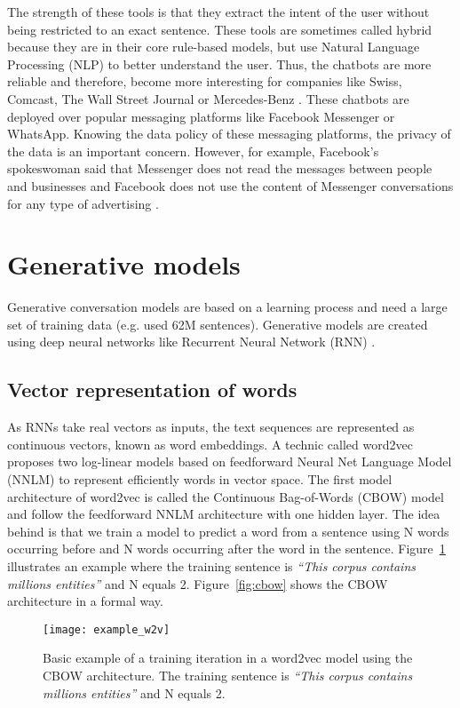 The strength of these tools is that they extract the intent of the user without being restricted to an exact sentence. These tools are sometimes called hybrid because they are in their core rule-based models, but use Natural Language Processing (NLP) to better understand the user. Thus, the chatbots are more reliable and therefore, become more interesting for companies like Swiss, Comcast, The Wall Street Journal or Mercedes-Benz \citep{dialogflow}. These chatbots are deployed over popular messaging platforms like Facebook Messenger or WhatsApp. Knowing the data policy of these messaging platforms, the privacy of the data is an important concern. However, for example, Facebook's spokeswoman said that Messenger does not read the messages between people and businesses and Facebook does not use the content of Messenger conversations for any type of advertising \citep{facebook-policy}.

\section{Generative models}
Generative conversation models are based on a learning process and need a large set of training data (e.g. \citet{1506.05869} used 62M sentences). Generative models are created using deep neural networks like Recurrent Neural Network (RNN) \citep{1503.02364,1506.05869}.

\subsection{Vector representation of words}

As RNNs take real vectors as inputs, the text sequences are represented as continuous vectors, known as word embeddings. A technic called word2vec \citep{1301.3781} proposes two log-linear models based on feedforward Neural Net Language Model (NNLM) to represent efficiently words in vector space. The first model architecture of word2vec is called the Continuous Bag-of-Words (CBOW) model and follow the feedforward NNLM architecture with one hidden layer.
The idea behind is that we train a model to predict a word from a sentence using N words occurring before and N words occurring after the word in the sentence. Figure~\ref{fig:example_w2v} illustrates an example where the training sentence is \textit{``This corpus contains millions entities''} and N equals 2. Figure~\ref{fig:cbow} shows the CBOW architecture in a formal way.

\begin{figure}
    \centering
    \texttt{[image: example\_w2v]}
    \caption[Word2Vec basic example]{Basic example of a training iteration in a word2vec model using the CBOW architecture. The training sentence is \textit{``This corpus contains millions entities''} and N equals 2.}
    \label{fig:example_w2v}
\end{figure}

